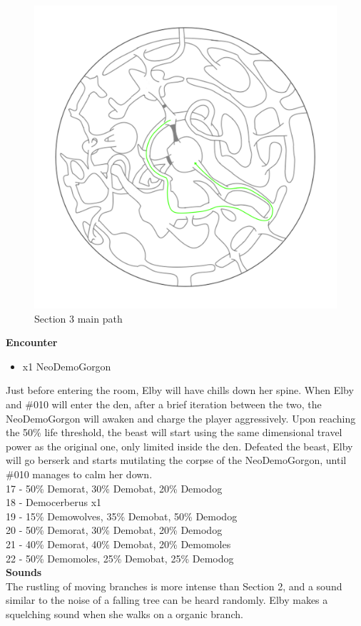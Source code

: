 \begin{figure}[H]
	\centering
	\includegraphics[width=0.7\linewidth]{images/map/map_principle_path_section_03.png}
	\caption*{Section 3 main path}
\end{figure}


\textbf{Encounter}
\begin{itemize}
	\item x1 NeoDemoGorgon
\end{itemize}
Just before entering the room, Elby will have chills down her spine. When Elby and \#010 will enter the den, after a brief iteration between the two, the NeoDemoGorgon will awaken and charge the player aggressively. Upon reaching the 50\% life threshold, the beast will start using the same dimensional travel power as the original one, only limited inside the den. Defeated the beast, Elby will go berserk and starts mutilating the corpse of the NeoDemoGorgon, until \#010 manages to calm her down.\\

17 - 50\% Demorat, 30\% Demobat, 20\% Demodog\\
18 - Democerberus x1\\
19 - 15\% Demowolves, 35\% Demobat, 50\% Demodog\\
20 - 50\% Demorat, 30\% Demobat, 20\% Demodog\\
21 - 40\% Demorat, 40\% Demobat, 20\% Demomoles\\
22 - 50\% Demomoles, 25\% Demobat, 25\% Demodog\\

\textbf{Sounds}\\
The rustling of moving branches is more intense than Section 2, and a sound similar to the noise of a falling tree can be heard randomly. Elby makes a squelching sound when she walks on a organic branch.\\

